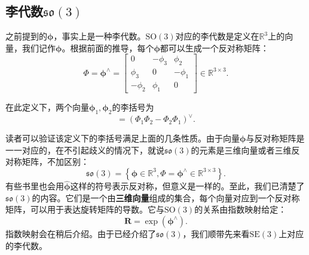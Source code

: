 \subsection{李代数$\mathfrak{so}(3)$}
之前提到的$\boldsymbol{\phi}$，事实上是一种李代数。$\mathrm{SO}(3)$对应的李代数是定义在$\mathbb{R}^3$上的向量，我们记作$\boldsymbol{\phi}$。根据前面的推导，每个$\boldsymbol{\phi}$都可以生成一个反对称矩阵：
\begin{equation}
\label{eq:phi}
\boldsymbol{\varPhi} = \boldsymbol{\phi}^{\wedge} = \left[ {\begin{array}{*{20}{c}}
	0&{ - {\phi _3}}&{{\phi _2}}\\
	{{\phi _3}}&0&{ - {\phi _1}}\\
	{ - {\phi _2}}&{{\phi _1}}&0
	\end{array}} \right] \in \mathbb{R}^{3 \times 3}.
\end{equation}

在此定义下，两个向量$\boldsymbol{\phi}_1, \boldsymbol{\phi}_2$的李括号为
\begin{equation}
[\boldsymbol{\phi}_1, \boldsymbol{\phi}_2] = \left( \bm{ \varPhi }_1 \bm{ \varPhi }_2 - \bm{ \varPhi }_2 \bm{ \varPhi }_1 \right)^\vee.
\end{equation}

读者可以验证该定义下的李括号满足上面的几条性质。由于向量$\boldsymbol{\phi}$与反对称矩阵是一一对应的，在不引起歧义的情况下，就说$\mathfrak{so}(3)$的元素是三维向量或者三维反对称矩阵，不加区别：
\begin{equation}
\mathfrak{so}(3) = \left\{ \boldsymbol{\phi} \in \mathbb{R}^3, \boldsymbol{\varPhi} = \boldsymbol{\phi^\wedge} \in \mathbb{R}^{3 \times 3} \right\}.
\end{equation}
有些书里也会用$\widehat{\boldsymbol{\phi}}$这样的符号表示反对称，但意义是一样的。至此，我们已清楚了$\mathfrak{so}(3)$的内容。它们是一个由\textbf{三维向量}组成的集合，每个向量对应到一个反对称矩阵，可以用于表达旋转矩阵的导数。它与$\mathrm{SO}(3)$的关系由指数映射给定：
\begin{equation}
\bm{R} = \exp ( \boldsymbol{\phi}^\wedge ).
\end{equation}
指数映射会在稍后介绍。由于已经介绍了$\mathfrak{so}(3)$，我们顺带先来看$\mathrm{SE}(3)$上对应的李代数。

